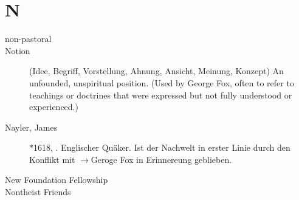 \section*{N}

\articlesize

\begin{description}

\item[non-pastoral] 

\item[Notion] (Idee, Begriff, Vorstellung, Ahnung, Ansicht, Meinung, Konzept)
    An unfounded, unspiritual position. (Used by George Fox, often to refer to teachings or doctrines that were expressed but not fully understood or experienced.)

 \item[Nayler, James] $\ast$1618, . Englischer Quäker. Ist der Nachwelt in erster Linie durch den Konflikt mit $\to$Geroge Fox in Erinnereung geblieben.

 \item[New Foundation Fellowship]

 \item[Nontheist Friends]

 \end{description}

\normalsize
